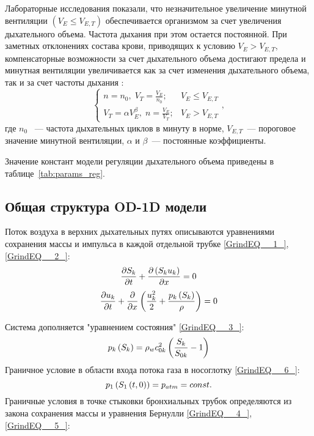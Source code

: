 Лабораторные исследования показали, что незначительное увеличение минутной вентиляции $\left( V_E \le V_{E,T} \right)$ обеспечивается организмом за счет увеличения дыхательного объема. Частота дыхания при этом остается постоянной. При заметных отклонениях состава крови, приводящих к условию $V_E > V_{E,T}$, компенсаторные возможности за счет дыхательного объема достигают предела и минутная вентиляции увеличивается как за счет изменения дыхательного объема, так и за счет частоты дыхания \cite{volkov2013}:
\begin{equation} \label{nVt}
\begin{cases}
n=n_{0},\; V_{T}=\frac{\displaystyle V_{E}}{\displaystyle n_{0}}; & V_{E} \le V_{E,T}  \\
V_{T}=\alpha V_{E}^{\displaystyle \beta},\; n= \frac{\displaystyle V_{E}}{\displaystyle V_{T}}; & V_{E} > V_{E,T}
\end{cases},
\end{equation}
\noindent где \( n_{0}\) ~---  частота дыхательных циклов в минуту в норме, 
\( V_{E,T}\)~--- пороговое значение минутной вентиляции, 
\( \alpha\) и \( \beta\)~--- постоянные коэффициенты.

Значение констант модели регуляции дыхательного объема приведены в таблице~\ref{tab:params_reg}.

\subsection{Общая структура OD-1D модели}

Поток воздуха в верхних дыхательных путях описываются уравнениями сохранения массы и импульса в каждой отдельной трубке \eqref{GrindEQ__1_},\eqref{GrindEQ__2_}:
\begin{equation} 
\frac{\partial S_{k} }{\partial t} +\frac{\partial \left(S_{k} u_{k} \right)}{\partial x} =0 \notag
\end{equation} 
\begin{equation} 
\frac{\partial u_{k} }{\partial t} +\frac{\partial }{\partial x} \left(\frac{u_{k}^{2} }{2} +\frac{p_{k} \left(S_{k} \right)}{\rho } \right)=0 \notag  
\end{equation} 

Система дополняется "уравнением состояния" \eqref{GrindEQ__3_}:
\begin{equation} 
p_{k} \left(S_{k} \right)=\rho _{w} c_{0k}^{2} \left(\frac{S_{k} }{S_{0k} } -1\right)\notag  
\end{equation} 
Граничное условие в области входа потока газа в носоглотку \eqref{GrindEQ__6_}: 
\begin{equation}
p_{1} \left(S_{1} \left(t,0\right)\right)=p_{atm} =const. \notag 
\end{equation} 
Граничные условия в точке стыковки бронхиальных трубок определяются из закона сохранения массы и уравнения Бернулли \eqref{GrindEQ__4_}, \eqref{GrindEQ__5_}:  

